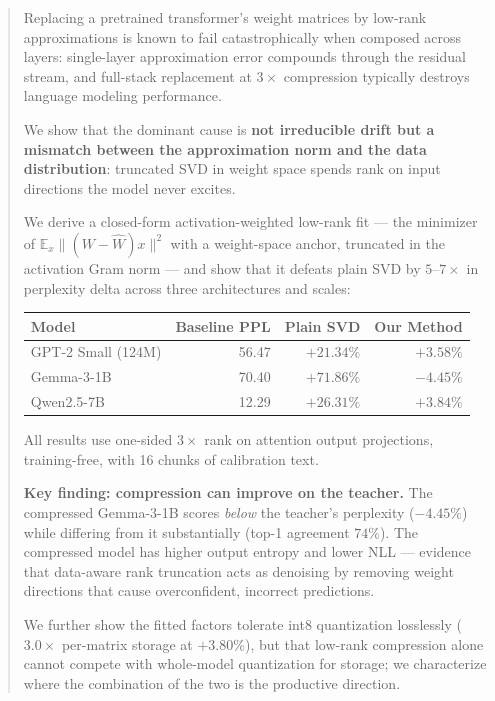 \documentclass[11pt]{article}
\newcommand{\Wh}{\widehat{W}}
\begin{document}
\begin{abstract}
Replacing a pretrained transformer's weight matrices by low-rank
approximations is known to fail catastrophically when composed across
layers: single-layer approximation error compounds through the residual
stream, and full-stack replacement at $3\times$ compression typically
destroys language modeling performance.

We show that the dominant cause is \textbf{not irreducible drift but a
mismatch between the approximation norm and the data distribution}:
truncated SVD in weight space spends rank on input directions the model
never excites.

We derive a closed-form activation-weighted low-rank fit --- the minimizer of
$\mathbb{E}_x\| (W-\Wh)x \|^2$ with a weight-space anchor, truncated in the
activation Gram norm --- and show that it defeats plain SVD by $5$--$7\times$
in perplexity delta across three architectures and scales:

\begin{center}
\begin{tabular}{lrrr}
\toprule
Model & Baseline PPL & Plain SVD & Our Method \\
\midrule
GPT-2 Small (124M) & 56.47 & $+21.34\%$ & $\mathbf{+3.58\%}$ \\
Gemma-3-1B & 70.40 & $+71.86\%$ & $\mathbf{-4.45\%}$ \\
Qwen2.5-7B & 12.29 & $+26.31\%$ & $\mathbf{+3.84\%}$ \\
\bottomrule
\end{tabular}
\end{center}

All results use one-sided $3\times$ rank on attention output projections,
training-free, with 16 chunks of calibration text.

\textbf{Key finding: compression can improve on the teacher.} The compressed
Gemma-3-1B scores \emph{below} the teacher's perplexity ($-4.45\%$) while
differing from it substantially (top-1 agreement $74\%$). The compressed
model has higher output entropy and lower NLL --- evidence that data-aware
rank truncation acts as denoising by removing weight directions that cause
overconfident, incorrect predictions.

We further show the fitted factors tolerate int8 quantization losslessly
($3.0\times$ per-matrix storage at $+3.80\%$), but that low-rank compression
alone cannot compete with whole-model quantization for storage; we characterize
where the combination of the two is the productive direction.
\end{abstract}
\end{document}
